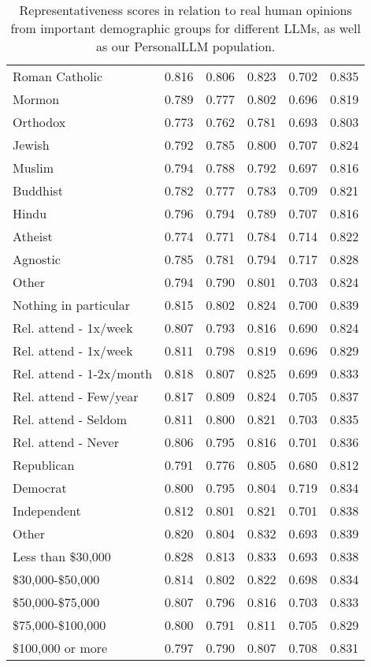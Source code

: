 \begin{table}[!ht]
\begin{tabular}{lccccc}
Roman Catholic & 0.816 & 0.806 & 0.823 & 0.702 & 0.835 \\
Mormon & 0.789 & 0.777 & 0.802 & 0.696 & 0.819 \\
Orthodox & 0.773 & 0.762 & 0.781 & 0.693 & 0.803 \\
Jewish & 0.792 & 0.785 & 0.800 & 0.707 & 0.824 \\
Muslim & 0.794 & 0.788 & 0.792 & 0.697 & 0.816 \\
Buddhist & 0.782 & 0.777 & 0.783 & 0.709 & 0.821 \\
Hindu & 0.796 & 0.794 & 0.789 & 0.707 & 0.816 \\
Atheist & 0.774 & 0.771 & 0.784 & 0.714 & 0.822 \\
Agnostic & 0.785 & 0.781 & 0.794 & 0.717 & 0.828 \\
Other & 0.794 & 0.790 & 0.801 & 0.703 & 0.824 \\
Nothing in particular & 0.815 & 0.802 & 0.824 & 0.700 & 0.839 \\
Rel. attend - \>1x/week & 0.807 & 0.793 & 0.816 & 0.690 & 0.824 \\
Rel. attend - 1x/week & 0.811 & 0.798 & 0.819 & 0.696 & 0.829 \\
Rel. attend - 1-2x/month & 0.818 & 0.807 & 0.825 & 0.699 & 0.833 \\
Rel. attend - Few/year & 0.817 & 0.809 & 0.824 & 0.705 & 0.837 \\
Rel. attend - Seldom & 0.811 & 0.800 & 0.821 & 0.703 & 0.835 \\
Rel. attend - Never & 0.806 & 0.795 & 0.816 & 0.701 & 0.836 \\
Republican & 0.791 & 0.776 & 0.805 & 0.680 & 0.812 \\
Democrat & 0.800 & 0.795 & 0.804 & 0.719 & 0.834 \\
Independent & 0.812 & 0.801 & 0.821 & 0.701 & 0.838 \\
Other & 0.820 & 0.804 & 0.832 & 0.693 & 0.839 \\
Less than \$30,000 & 0.828 & 0.813 & 0.833 & 0.693 & 0.838 \\
\$30,000-\$50,000 & 0.814 & 0.802 & 0.822 & 0.698 & 0.834 \\
\$50,000-\$75,000 & 0.807 & 0.796 & 0.816 & 0.703 & 0.833 \\
\$75,000-\$100,000 & 0.800 & 0.791 & 0.811 & 0.705 & 0.829 \\
\$100,000 or more & 0.797 & 0.790 & 0.807 & 0.708 & 0.831 \\
    \bottomrule
    \end{tabular}
    \caption{Representativeness scores in relation to real human opinions from important demographic groups for different LLMs, as well as our \textsf{PersonalLLM} population.}
    \label{tab:opinion_qa_full}
\end{table}

